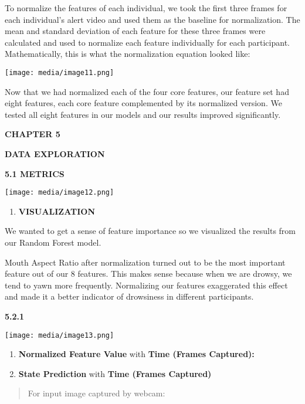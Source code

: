 \documentclass[a4paper,12pt]{article}
\begin{document}
To normalize the features of each individual, we took the first three
frames for each individual's alert video and used them as the baseline
for normalization. The mean and standard deviation of each feature for
these three frames were calculated and used to normalize each feature
individually for each participant. Mathematically, this is what the
normalization equation looked like:

\texttt{[image: media/image11.png]}

Now that we had normalized each of the four core features, our feature
set had eight features, each core feature complemented by its normalized
version. We tested all eight features in our models and our results
improved significantly.

\textbf{CHAPTER 5}

\textbf{DATA EXPLORATION}

\textbf{5.1 METRICS}

\texttt{[image: media/image12.png]}

\begin{enumerate}
\def\labelenumi{\arabic{enumi}.}
\setcounter{enumi}{1}
\item
  \textbf{VISUALIZATION}
\end{enumerate}

We wanted to get a sense of feature importance so we visualized the
results from our Random Forest model.

Mouth Aspect Ratio after normalization turned out to be the most
important feature out of our 8 features. This makes sense because when
we are drowsy, we tend to yawn more frequently. Normalizing our features
exaggerated this effect and made it a better indicator of drowsiness in
different participants.

\textbf{5.2.1}

\texttt{[image: media/image13.png]}

\begin{enumerate}
\def\labelenumi{\arabic{enumi}.}
\setcounter{enumi}{1}
\item
  \textbf{Normalized Feature Value} with \textbf{Time (Frames
  Captured):}
\item
  \textbf{State Prediction} with \textbf{Time (Frames Captured)}
\end{enumerate}

\begin{quote}
For input image captured by webcam:
\end{quote}
\end{document}
